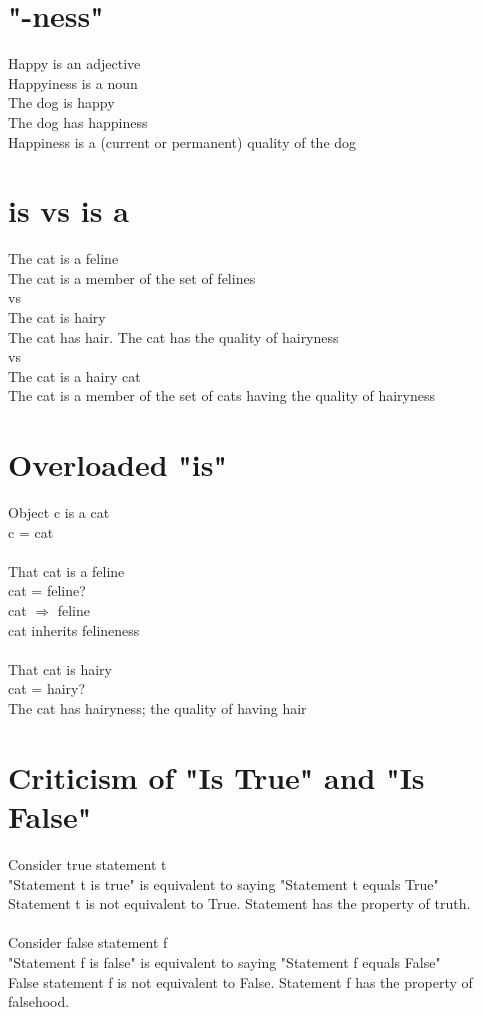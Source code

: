 \documentclass[11pt]{article}
\begin{document}
\section{"-ness"}
Happy is an adjective\\
Happyiness is a noun\\
The dog is happy\\
The dog has happiness\\
Happiness is a (current or permanent) quality of the dog

\section{is vs is a}
The cat is a feline\\
The cat is a member of the set of felines\\
vs\\
The cat is hairy\\
The cat has hair. The cat has the quality of hairyness\\
vs\\
The cat is a hairy cat\\
The cat is a member of the set of cats having the quality of hairyness\\


\section{Overloaded "is"}
Object c is a cat\\
c = cat\\
\\
That cat is a feline\\
cat = feline?\\
cat $\Rightarrow$ feline\\
cat inherits felineness\\
\\
That cat is hairy\\
cat = hairy?\\
The cat has hairyness; the quality of having hair


\section{Criticism of "Is True" and "Is False"}
Consider true statement t\\
"Statement t is true" is equivalent to saying "Statement t equals True"\\
Statement t is not equivalent to True. Statement has the property of truth.\\
\\
Consider false statement f\\
"Statement f is false" is equivalent to saying "Statement f equals False"\\
False statement f is not equivalent to False. Statement f has the property of falsehood.\\
\end{document}
